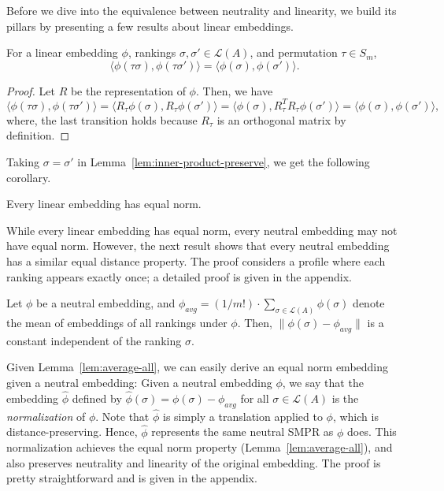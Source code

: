 \documentclass[prodmode,acmec]{ec-acmsmall}
\newcommand{\calL}{{\mathcal{L}}}
\newcommand{\rank}{{\calL(A)}}
\begin{document}
Before we dive into the equivalence between neutrality and linearity, we build its pillars by presenting a few results about linear embeddings. 
\begin{lemma}
For a linear embedding $\phi$, rankings $\sigma,\sigma' \in \rank$, and permutation $\tau \in S_m$, 
$$
\langle \phi(\tau \sigma), \phi(\tau \sigma') \rangle = \langle \phi(\sigma), \phi(\sigma') \rangle.
$$
\label{lem:inner-product-preserve}
\end{lemma}
\begin{proof}
Let $R$ be the representation of $\phi$. Then, we have 
\begin{equation}
\langle \phi(\tau \sigma), \phi(\tau \sigma') \rangle = \langle R_{\tau}\phi(\sigma), R_{\tau}\phi(\sigma') \rangle = \langle \phi(\sigma), R_{\tau}^T R_{\tau}\phi(\sigma') \rangle = \langle \phi(\sigma), \phi(\sigma') \rangle,
\label{eqn:linear-inner-product}
\end{equation}
where, the last transition holds because $R_{\tau}$ is an orthogonal matrix by definition. 
\end{proof}

Taking $\sigma = \sigma'$ in Lemma~\ref{lem:inner-product-preserve}, we get the following corollary.
\begin{corollary}
Every linear embedding has equal norm.
\label{cor:linear-equal-norm}
\end{corollary}

While every linear embedding has equal norm, every neutral embedding may not have equal norm. However, the next result shows that every neutral embedding has a similar equal distance property. The proof considers a profile where each ranking appears exactly once; a detailed proof is given in the appendix.

\begin{lemma}
Let $\phi$ be a neutral embedding, and $\phi_{avg} = (1/m!) \cdot \sum_{\sigma \in \rank} \phi(\sigma)$ denote the mean of embeddings of all rankings under $\phi$. Then, $\|\phi(\sigma)-\phi_{avg}\|$ is a constant independent of the ranking $\sigma$.
\label{lem:average-all}
\end{lemma}

Given Lemma~\ref{lem:average-all}, we can easily derive an equal norm embedding given a neutral embedding: Given a neutral embedding $\phi$, we say that the embedding $\hat{\phi}$ defined by $\hat{\phi}(\sigma) = \phi(\sigma) - \phi_{avg}$ for all $\sigma \in \rank$ is the \emph{normalization} of $\phi$. Note that $\hat{\phi}$ is simply a translation applied to $\phi$, which is distance-preserving. Hence, $\hat{\phi}$ represents the same neutral SMPR as $\phi$ does. This normalization achieves the equal norm property (Lemma~\ref{lem:average-all}), and also preserves neutrality and linearity of the original embedding. The proof is pretty straightforward and is given in the appendix.
\end{document}
